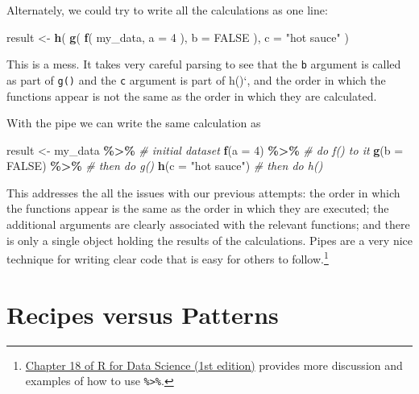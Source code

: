 \documentclass[
]{book}
\newenvironment{Shaded}{\begin{snugshade}}{\end{snugshade}}
\newcommand{\AttributeTok}[1]{\textcolor[rgb]{0.13,0.29,0.53}{#1}}
\newcommand{\CommentTok}[1]{\textcolor[rgb]{0.56,0.35,0.01}{\textit{#1}}}
\newcommand{\ConstantTok}[1]{\textcolor[rgb]{0.56,0.35,0.01}{#1}}
\newcommand{\DecValTok}[1]{\textcolor[rgb]{0.00,0.00,0.81}{#1}}
\newcommand{\FunctionTok}[1]{\textcolor[rgb]{0.13,0.29,0.53}{\textbf{#1}}}
\newcommand{\NormalTok}[1]{#1}
\newcommand{\OtherTok}[1]{\textcolor[rgb]{0.56,0.35,0.01}{#1}}
\newcommand{\SpecialCharTok}[1]{\textcolor[rgb]{0.81,0.36,0.00}{\textbf{#1}}}
\newcommand{\StringTok}[1]{\textcolor[rgb]{0.31,0.60,0.02}{#1}}
\begin{document}
Alternately, we could try to write all the calculations as one line:

\begin{Shaded}
\begin{Highlighting}[]
\NormalTok{result }\OtherTok{\textless{}{-}} \FunctionTok{h}\NormalTok{( }\FunctionTok{g}\NormalTok{( }\FunctionTok{f}\NormalTok{( my\_data, }\AttributeTok{a =} \DecValTok{4}\NormalTok{ ), }\AttributeTok{b =} \ConstantTok{FALSE}\NormalTok{ ), }\AttributeTok{c =} \StringTok{"hot sauce"}\NormalTok{ )}
\end{Highlighting}
\end{Shaded}

This is a mess. It takes very careful parsing to see that the \texttt{b} argument is called as part of \texttt{g()} and the \texttt{c} argument is part of h()`, and the order in which the functions appear is not the same as the order in which they are calculated.

With the pipe we can write the same calculation as

\begin{Shaded}
\begin{Highlighting}[]
\NormalTok{result }\OtherTok{\textless{}{-}} 
\NormalTok{  my\_data }\SpecialCharTok{\%\textgreater{}\%}        \CommentTok{\# initial dataset}
  \FunctionTok{f}\NormalTok{(}\AttributeTok{a =} \DecValTok{4}\NormalTok{) }\SpecialCharTok{\%\textgreater{}\%}       \CommentTok{\# do f() to it}
  \FunctionTok{g}\NormalTok{(}\AttributeTok{b =} \ConstantTok{FALSE}\NormalTok{) }\SpecialCharTok{\%\textgreater{}\%}   \CommentTok{\# then do g()}
  \FunctionTok{h}\NormalTok{(}\AttributeTok{c =} \StringTok{"hot sauce"}\NormalTok{) }\CommentTok{\# then do h()}
\end{Highlighting}
\end{Shaded}

This addresses the all the issues with our previous attempts:
the order in which the functions appear is the same as the order in which they are executed;
the additional arguments are clearly associated with the relevant functions;
and there is only a single object holding the results of the calculations.
Pipes are a very nice technique for writing clear code that is easy for others to follow.\footnote{\href{https://r4ds.had.co.nz/pipes.html}{Chapter 18 of R for Data Science (1st edition)} provides more discussion and examples of how to use \texttt{\%\textgreater{}\%}.}

\section{Recipes versus Patterns}\label{recipes-versus-patterns}
\end{document}
